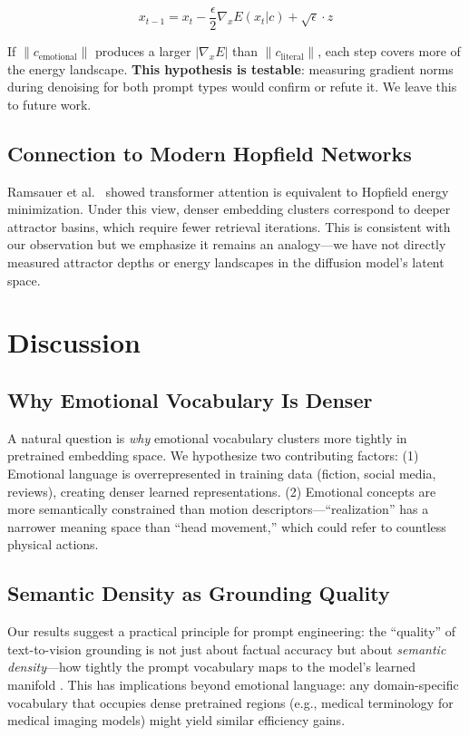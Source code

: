\documentclass[10pt,twocolumn,letterpaper]{article}
\begin{document}
\begin{equation}
x_{t-1} = x_t - \frac{\epsilon}{2} \nabla_x E(x_t | c) + \sqrt{\epsilon} \cdot z
\end{equation}

If $\|c_{\text{emotional}}\|$ produces a larger $|\nabla_x E|$ than $\|c_{\text{literal}}\|$, each step covers more of the energy landscape. \textbf{This hypothesis is testable}: measuring gradient norms during denoising for both prompt types would confirm or refute it. We leave this to future work.

\subsection{Connection to Modern Hopfield Networks}

Ramsauer et al.\ \cite{ramsauer2021} showed transformer attention is equivalent to Hopfield energy minimization. Under this view, denser embedding clusters correspond to deeper attractor basins, which require fewer retrieval iterations. This is consistent with our observation but we emphasize it remains an analogy---we have not directly measured attractor depths or energy landscapes in the diffusion model's latent space.

\section{Discussion}

\subsection{Why Emotional Vocabulary Is Denser}

A natural question is \textit{why} emotional vocabulary clusters more tightly in pretrained embedding space. We hypothesize two contributing factors: (1) Emotional language is overrepresented in training data (fiction, social media, reviews), creating denser learned representations. (2) Emotional concepts are more semantically constrained than motion descriptors---``realization'' has a narrower meaning space than ``head movement,'' which could refer to countless physical actions.

\subsection{Semantic Density as Grounding Quality}

Our results suggest a practical principle for prompt engineering: the ``quality'' of text-to-vision grounding is not just about factual accuracy but about \textit{semantic density}---how tightly the prompt vocabulary maps to the model's learned manifold \cite{bisk2020}. This has implications beyond emotional language: any domain-specific vocabulary that occupies dense pretrained regions (e.g., medical terminology for medical imaging models) might yield similar efficiency gains.
\end{document}
